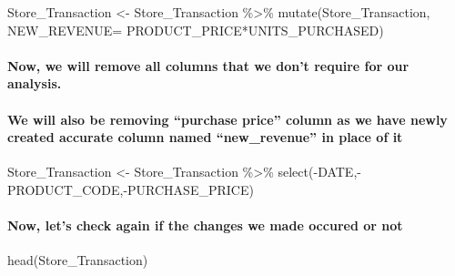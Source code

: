 \documentclass[
]{article}
\newenvironment{Shaded}{\begin{snugshade}}{\end{snugshade}}
\newcommand{\AttributeTok}[1]{\textcolor[rgb]{0.77,0.63,0.00}{#1}}
\newcommand{\FunctionTok}[1]{\textcolor[rgb]{0.00,0.00,0.00}{#1}}
\newcommand{\NormalTok}[1]{#1}
\newcommand{\OtherTok}[1]{\textcolor[rgb]{0.56,0.35,0.01}{#1}}
\newcommand{\SpecialCharTok}[1]{\textcolor[rgb]{0.00,0.00,0.00}{#1}}
\begin{document}
\begin{Shaded}
\begin{Highlighting}[]
\NormalTok{Store\_Transaction }\OtherTok{\textless{}{-}}\NormalTok{ Store\_Transaction }\SpecialCharTok{\%\textgreater{}\%} \FunctionTok{mutate}\NormalTok{(Store\_Transaction, }\AttributeTok{NEW\_REVENUE=}\NormalTok{ PRODUCT\_PRICE}\SpecialCharTok{*}\NormalTok{UNITS\_PURCHASED)}
\end{Highlighting}
\end{Shaded}

\hypertarget{now-we-will-remove-all-columns-that-we-dont-require-for-our-analysis.}{%
\paragraph{Now, we will remove all columns that we don't require for our
analysis.}\label{now-we-will-remove-all-columns-that-we-dont-require-for-our-analysis.}}

\hypertarget{we-will-also-be-removing-purchase-price-column-as-we-have-newly-created-accurate-column-named-new_revenue-in-place-of-it}{%
\paragraph{We will also be removing ``purchase price'' column as we have
newly created accurate column named ``new\_revenue'' in place of
it}\label{we-will-also-be-removing-purchase-price-column-as-we-have-newly-created-accurate-column-named-new_revenue-in-place-of-it}}

\begin{Shaded}
\begin{Highlighting}[]
\NormalTok{Store\_Transaction }\OtherTok{\textless{}{-}}\NormalTok{ Store\_Transaction }\SpecialCharTok{\%\textgreater{}\%} \FunctionTok{select}\NormalTok{(}\SpecialCharTok{{-}}\NormalTok{DATE,}\SpecialCharTok{{-}}\NormalTok{PRODUCT\_CODE,}\SpecialCharTok{{-}}\NormalTok{PURCHASE\_PRICE)}
\end{Highlighting}
\end{Shaded}

\hypertarget{now-lets-check-again-if-the-changes-we-made-occured-or-not}{%
\paragraph{Now, let's check again if the changes we made occured or
not}\label{now-lets-check-again-if-the-changes-we-made-occured-or-not}}

\begin{Shaded}
\begin{Highlighting}[]
\FunctionTok{head}\NormalTok{(Store\_Transaction)}
\end{Highlighting}
\end{Shaded}
\end{document}
